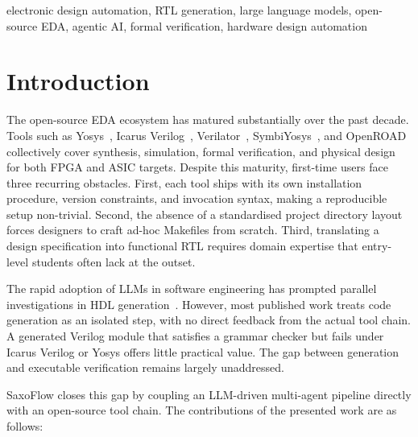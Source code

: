 \begin{IEEEkeywords}
electronic design automation, RTL generation, large language models,
open-source EDA, agentic AI, formal verification, hardware design automation
\end{IEEEkeywords}

\section{Introduction}
\label{sec:intro}

The open-source \ac{EDA} ecosystem has matured substantially over the past
decade. Tools such as Yosys~\cite{yosys}, Icarus Verilog~\cite{iverilog},
Verilator~\cite{verilator}, SymbiYosys~\cite{symbiyosys}, and
OpenROAD~\cite{openroad} collectively cover synthesis, simulation, formal
verification, and physical design for both \ac{FPGA} and \ac{ASIC} targets.
Despite this maturity, first-time users face three recurring obstacles. First,
each tool ships with its own installation procedure, version constraints, and
invocation syntax, making a reproducible setup non-trivial. Second, the
absence of a standardised project directory layout forces designers to craft
ad-hoc Makefiles from scratch. Third, translating a design specification into
functional \ac{RTL} requires domain expertise that entry-level students often
lack at the outset.

The rapid adoption of \acp{LLM} in software engineering has prompted parallel
investigations in \ac{HDL} generation~\cite{chipchat,rtlcoder,chateda}.
However, most published work treats code generation as an isolated step, with
no direct feedback from the actual tool chain. A generated Verilog module that
satisfies a grammar checker but fails under Icarus Verilog or Yosys offers
little practical value. The gap between generation and executable verification
remains largely unaddressed.

SaxoFlow closes this gap by coupling an \ac{LLM}-driven multi-agent pipeline
directly with an open-source tool chain. The contributions of the presented
work are as follows:


